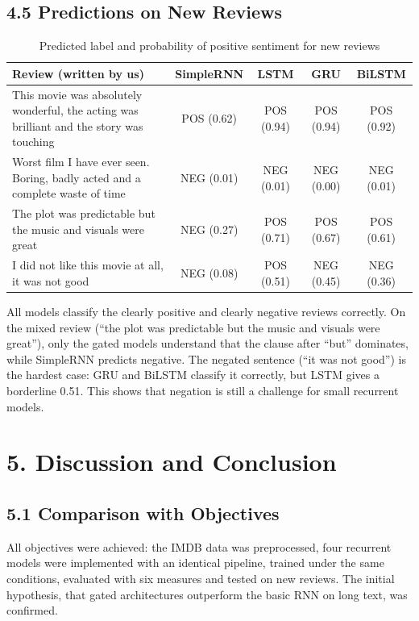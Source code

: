 \documentclass[12pt,a4paper,oneside]{report}
\begin{document}
\section*{4.5 Predictions on New Reviews}
\begin{table}[H]\centering\small
\caption{Predicted label and probability of positive sentiment for new reviews}
\begin{tabularx}{\textwidth}{>{\raggedright\arraybackslash}Xcccc}\toprule
\textbf{Review (written by us)} & \textbf{SimpleRNN} & \textbf{LSTM} & \textbf{GRU} & \textbf{BiLSTM} \\\midrule
This movie was absolutely wonderful, the acting was brilliant and the story was touching & POS (0.62) & POS (0.94) & POS (0.94) & POS (0.92) \\
Worst film I have ever seen. Boring, badly acted and a complete waste of time & NEG (0.01) & NEG (0.01) & NEG (0.00) & NEG (0.01) \\
The plot was predictable but the music and visuals were great & NEG (0.27) & POS (0.71) & POS (0.67) & POS (0.61) \\
I did not like this movie at all, it was not good & NEG (0.08) & POS (0.51) & NEG (0.45) & NEG (0.36) \\
\bottomrule\end{tabularx}\end{table}
All models classify the clearly positive and clearly negative reviews correctly. On the mixed review (``the plot was predictable but the music and visuals were great''), only the gated models understand that the clause after ``but'' dominates, while SimpleRNN predicts negative. The negated sentence (``it was not good'') is the hardest case: GRU and BiLSTM classify it correctly, but LSTM gives a borderline 0.51. This shows that negation is still a challenge for small recurrent models.

\chapter*{5. Discussion and Conclusion}
\section*{5.1 Comparison with Objectives}
All objectives were achieved: the IMDB data was preprocessed, four recurrent models were implemented with an identical pipeline, trained under the same conditions, evaluated with six measures and tested on new reviews. The initial hypothesis, that gated architectures outperform the basic RNN on long text, was confirmed.
\end{document}
